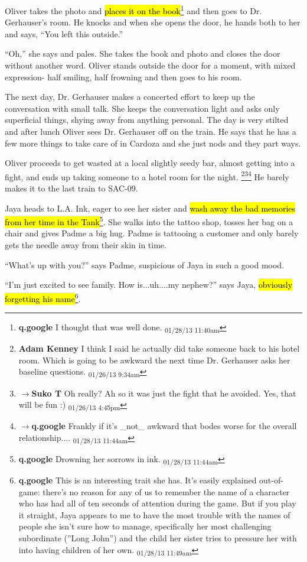 Oliver takes the photo and \hl{places it on the book}\footnote{\textbf{q.google }I thought that was well done. \textsubscript{01/28/13 11:40am}} and then goes to Dr. Gerhauser's room.  He knocks and when she opens the door, he hands both to her and says, ``You left this outside.''

``Oh,'' she says and pales.  She takes the book and photo and closes the door without another word.  Oliver stands outside the door for a moment, with mixed expression- half smiling, half frowning and then goes to his room.



The next day, Dr. Gerhauser makes a concerted effort to keep up the conversation with small talk.  She keeps the conversation light and asks only superficial things, shying away from anything personal.  The day is very stilted and after lunch Oliver sees Dr. Gerhauser off on the train.  He says that he has a few more things to take care of in Cardoza and she just nods and they part ways.



Oliver proceeds to get wasted at a local slightly seedy bar, almost getting into a fight, and ends up taking someone to a hotel room for the night. \footnote{\textbf{Adam Kenney }I think I said he actually did take someone back to his hotel room. Which is going to be awkward the next time Dr. Gerhauser asks her baseline questions. \textsubscript{01/26/13 9:34am}}\footnote{$\rightarrow$\textbf{Suko T }Oh really?  Ah so it was just the fight that he avoided.  Yes, that will be fun :) \textsubscript{01/26/13 4:45pm}}\footnote{$\rightarrow$\textbf{q.google }Frankly if it's \_not\_ awkward that bodes worse for the overall relationship.... \textsubscript{01/28/13 11:44am}} He barely makes it to the last train to SAC-09.



Jaya heads to L.A. Ink, eager to see her sister and \hl{wash away the bad memories from her time in the Tank}\footnote{\textbf{q.google }Drowning her sorrows in ink. \textsubscript{01/28/13 11:44am}}.  She walks into the tattoo shop, tosses her bag on a chair and gives Padme a big hug.  Padme is tattooing a customer and only barely gets the needle away from their skin in time.

``What's up with you?'' says Padme, suspicious of Jaya in such a good mood.

``I'm just excited to see family.  How is...uh....my nephew?'' says Jaya, \hl{obviously forgetting his name}\footnote{\textbf{q.google }This is an interesting trait she has.  It's easily explained out-of-game: there's no reason for any of us to remember the name of a character who has had all of ten seconds of attention during the game.  But if you play it straight, Jaya appears to me to have the most trouble with the names of people she isn't sure how to manage, specifically her most challenging subordinate (''Long John'') and the child her sister tries to pressure her with into having children of her own. \textsubscript{01/28/13 11:49am}}.

